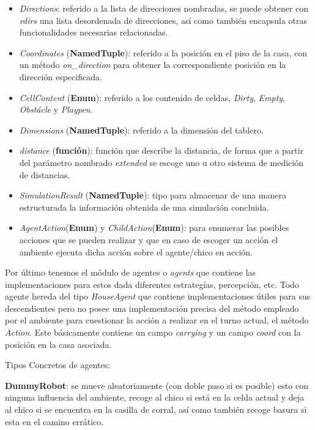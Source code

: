 \documentclass[a4paper,10pt,twocolumn]{article}
\begin{document}
 
 \begin{itemize}
 	\item \textit{Directions}: referido a la lista de direcciones nombradas, se puede obtener con \textit{rdirs} una lista desordenada de direcciones, as\'i como tambi\'en encapsula otras funcionalidades necesarias relacionadas.
 	\item \textit{Coordinates} (\textbf{NamedTuple}): referido a la posici\'on en el piso de la casa, con un m\'etodo \textit{on\_direction} para obtener la correspondiente posici\'on en la direcci\'on especificada.
 	\item \textit{CellContent} (\textbf{Enum}): referido a los contenido de celdas, \textit{Dirty}, \textit{Empty}, \textit{Obst\'acle} y \textit{Playpen}.
 	\item \textit{Dimensions} (\textbf{NamedTuple}): referido a la dimensi\'on del tablero.
 	\item \textit{distance} (\textbf{funci\'on}):  funci\'on que describe la distancia, de forma que a partir del par\'ametro nombrado \textit{extended} se escoge uno u otro sistema de medici\'on de distancias.
 	\item \textit{SimulationResult} (\textbf{NamedTuple}): tipo para almacenar de una manera estructurada la informaci\'on obtenida de una simulaci\'on concluida.
 	
 	\item \textit{AgentAction}(\textbf{Enum}) y \textit{ChildAction}(\textbf{Enum}): para enumerar las posibles acciones que se pueden realizar y que en caso de escoger un acci\'on el ambiente ejecuta dicha acci\'on sobre el agente/chico en acci\'on.
 \end{itemize}


 Por \'ultimo tenemos el m\'odulo de agentes o \textit{agents} que contiene las implementaciones para estos dada diferentes estrateg\'ias, percepci\'on, etc. Todo agente hereda del tipo \textit{HouseAgent} que contiene implementaciones \'utiles para sus descendientes pero no posee una implementaci\'on precisa del m\'etodo empleado por el ambiente para cuestionar la acci\'on a realizar en el turno actual, el m\'etodo \textit{Action}. Este b\'asicamente contiene un campo \textit{carrying} y un campo \textit{coord} con la posici\'on en la casa asociada.

 Tipos Concretos de agentes: 
 
 \textbf{DummyRobot}: se mueve aleatoriamente (con doble paso si es posible) esto con ninguna influencia del ambiente, recoge al chico si est\'a en la celda actual y deja al chico si se encuentra en la casilla de corral, as\'i como tambi\'en recoge basura si esta en el camino err\'atico.
 
\end{document}
